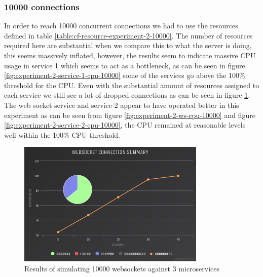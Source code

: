 \begin{table}[H]
\caption{Resources allocated to each service}
\label{table:cf-resource-experiment-2-10000}
\end{table}

\subsubsection{10000 connections}

In order to reach 10000 concurrent connections we had to use the resources defined in table \ref{table:cf-resource-experiment-2-10000}. The number of resources required here are substantial when we compare this to what the server is doing, this seems massively inflated, however, the results seem to indicate massive CPU usage in service 1 which seems to act as a bottleneck, as can be seen in figure \ref{fig:experiment-2-service-1-cpu-10000} some of the services go above the 100\% threshold for the CPU. Even with the substantial amount of resources assigned to each service we still see a lot of dropped connections as can be seen in figure \ref{fig:experiment-2-conn-10000}. The web socket service and service 2 appear to have operated better in this experiment as can be seen from figure \ref{fig:experiment-2-ws-cpu-10000} and figure \ref{fig:experiment-2-service-2-cpu-10000}, the CPU remained at reasonable levels well within the 100\% CPU threshold.

\begin{figure}[H]
  \centering
    \includegraphics[width=0.8\textwidth]{figures/experiments/experiment-2/10000/conn-10000.png}
    \caption{Results of simulating 10000 websockets against 3 microservices}
    \label{fig:experiment-2-conn-10000}
\end{figure}

